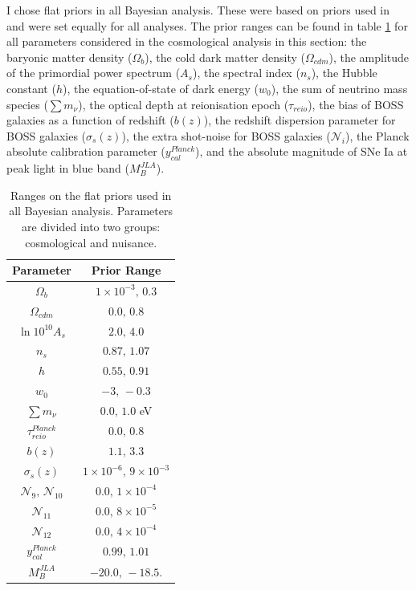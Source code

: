 \qquad I chose flat priors in all Bayesian analysis. These were based on priors used in \cite{JLAdata,2016BOSSCosmology,PlanckCosmology2016,2017arXiv170801530D} and were set equally for all analyses. The prior ranges can be found in table \ref{Tb:Priors} for all parameters considered in the cosmological analysis in this section: the baryonic matter density ($\Omega_b$), the cold dark matter density ($\Omega_{cdm}$), the amplitude of the primordial power spectrum ($A_s$), the spectral index ($n_s$), the Hubble constant ($h$), the equation-of-state of dark energy ($w_0$), the sum of neutrino mass species ($\sum m_{\nu}$), the optical depth at reionisation epoch ($\tau_{reio}$), the bias of BOSS galaxies as a function of redshift ($b(z)$), the redshift dispersion parameter for BOSS galaxies ($\sigma_s(z)$), the extra shot-noise for BOSS galaxies ($\mathcal{N}_i$), the Planck absolute calibration parameter ($y_{cal}^{Planck}$), and the absolute magnitude of SNe Ia at peak light in blue band ($M_B^{JLA}$).

\begin{table}
  \centering
  \caption[Prior ranges used in the BOSS analysis.]{Ranges on the flat priors used in all Bayesian analysis. Parameters are divided into two groups: cosmological and nuisance.}
  \label{Tb:Priors}
  \begin{tabular}{cc}
    \hline
    \hline
    Parameter & Prior Range \\
    \hline
        \hline
     $\Omega_b$ & $1 \times 10^{-3}, \, 0.3$    \\
     $\Omega_{cdm}$ & $0.0, \, 0.8$    \\[0.1cm]
     $\ln 10^{10} A_s$ & $2.0, \, 4.0$    \\
     $n_s$ & $0.87, \, 1.07$    \\
     $h$ & $0.55, \,0.91$ \\
     $w_0$ & $-3, \,-0.3$ \\
     $\sum m_{\nu}$ & $0.0,\, 1.0$ eV\\[0.1cm]
     $\tau^{Planck}_{reio}$  & $0.0,\, 0.8$ \\
     \hline
     $b(z)$  & $1.1,\, 3.3$ \\
     $\sigma_s(z)$ & $1 \times 10^{-6},\, 9 \times 10^{-3}$ \\
     $\mathcal{N}_{9}, \, \mathcal{N}_{10}$ & $0.0, \, 1\times 10^{-4}$ \\
     $\mathcal{N}_{11}$ & $0.0, \, 8\times 10^{-5}$ \\
     $\mathcal{N}_{12}$ & $0.0, \, 4\times 10^{-4}$ \\
     $y_{cal}^{Planck}$ & $0.99, \, 1.01$ \\
     $M_B^{JLA}$ & $-20.0,\, -18.5.$\\
     \hline
        \hline
  \end{tabular}
\end{table}

